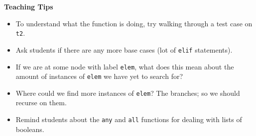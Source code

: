 \begin{blocksection}
\begin{guide}
    \textbf{Teaching Tips}
    \begin{itemize}
        \item To understand what the function is doing, try walking through a test case on \lstinline{t2}.
        \item Ask students if there are any more base cases (lot of \lstinline{elif} statements).
        \item If we are at some node with label \lstinline{elem}, what does this mean about the amount of instances of \lstinline{elem} we have yet to search for?
        \item Where could we find more instances of \lstinline{elem}? The branches; so we should recurse on them.
        \item Remind students about the \lstinline{any} and \lstinline{all} functions for dealing with lists of booleans.
    \end{itemize}
 \end{guide}

\end{blocksection}
